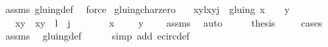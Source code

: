 \begin{isabellebody}
%
\isatagproof
{}\isamarkupfalse%
\ assms\ gluing{\isacharunderscore}def\ \isamarkupfalse%
\ force{\isacharplus}%
\endisatagproof
{\isafoldproof}%
%
\isadelimproof
\isanewline
%
\endisadelimproof
\isanewline
{}\isamarkupfalse%
\ gluing{\isacharunderscore}char{\isacharunderscore}zero{\isacharcolon}\isanewline
\ \ \ {\isachardoublequoteopen}{\isacharparenleft}{\isacharparenleft}{\isacharparenleft}x{}{\isacharcomma}y{}{\isacharparenright}{\isacharcomma}l{\isacharparenright}{\isacharcomma}{\isacharparenleft}{\isacharparenleft}x{}{\isacharcomma}y{}{\isacharparenright}{\isacharcomma}j{\isacharparenright}{\isacharparenright}\ {\isasymin}\ gluing{\isachardoublequoteclose}\ {\isachardoublequoteopen}x{}\ {\isacharequal}\ {}\ {\isasymor}\ y{}\ {\isacharequal}\ {}{\isachardoublequoteclose}\isanewline
\ \ \ {\isachardoublequoteopen}{\isacharparenleft}x{}{\isacharcomma}y{}{\isacharparenright}\ {\isacharequal}\ {\isacharparenleft}x{}{\isacharcomma}y{}{\isacharparenright}\ {\isasymand}\ l\ {\isacharequal}\ j{\isachardoublequoteclose}\isanewline
%
\isadelimproof
%
\endisadelimproof
%
\isatagproof
{}\isamarkupfalse%
\ {\isacharminus}\ \isanewline
\ \ \isamarkupfalse%
\ {\isacharparenleft}{}{\isacharparenright}\ {\isachardoublequoteopen}x{}\ {\isacharequal}\ {}{\isachardoublequoteclose}\ {\isacharbar}\ {\isacharparenleft}{}{\isacharparenright}\ {\isachardoublequoteopen}y{}\ {\isacharequal}\ {}{\isachardoublequoteclose}\ \isamarkupfalse%
\ assms\ \isamarkupfalse%
\ auto\isanewline
\ \ \isamarkupfalse%
\ \isamarkupfalse%
\ {\isacharquery}thesis\isanewline
\ \ \ \ \isamarkupfalse%
{\isacharparenleft}cases{\isacharparenright}\isanewline
\ \ \ \ \isamarkupfalse%
\ assms{\isacharparenleft}{}{\isacharparenright}\ \isamarkupfalse%
\ gluing{\isacharunderscore}def\ \isanewline
\ \ \ \ \isamarkupfalse%
{\isacharparenleft}simp\ add{\isacharcolon}\ e{\isacharunderscore}circ{\isacharunderscore}def{\isacharparenright}{\isacharplus}\isanewline
{}\isamarkupfalse%
%
\endisatagproof
{\isafoldproof}%
%
\isadelimproof
\isanewline
%
\endisadelimproof
\isanewline
\isanewline
\isanewline
{}\isamarkupfalse%

\end{isabellebody}
